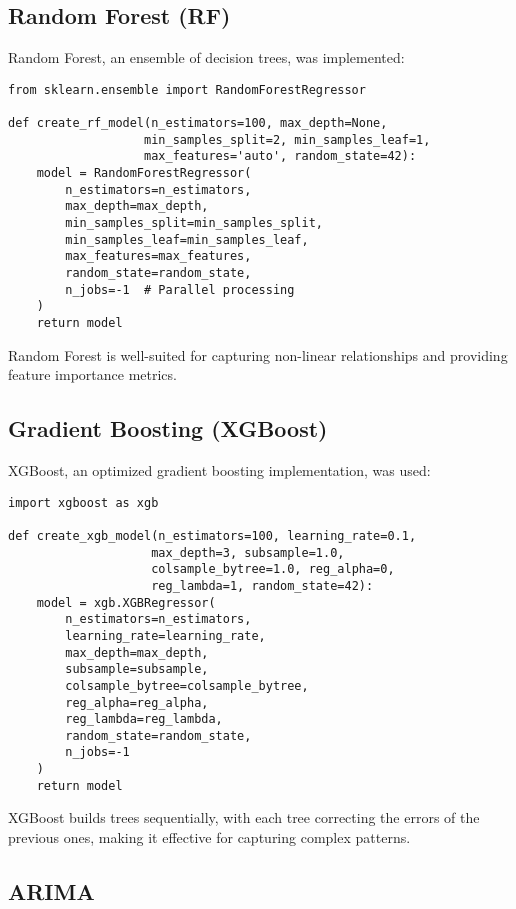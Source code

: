 \documentclass[12pt]{article}
\begin{document}
\subsection{Random Forest (RF)}
\label{subsec:rf}

Random Forest, an ensemble of decision trees, was implemented:

\begin{verbatim}
from sklearn.ensemble import RandomForestRegressor

def create_rf_model(n_estimators=100, max_depth=None, 
                   min_samples_split=2, min_samples_leaf=1,
                   max_features='auto', random_state=42):
    model = RandomForestRegressor(
        n_estimators=n_estimators,
        max_depth=max_depth,
        min_samples_split=min_samples_split,
        min_samples_leaf=min_samples_leaf,
        max_features=max_features,
        random_state=random_state,
        n_jobs=-1  # Parallel processing
    )
    return model
\end{verbatim}

Random Forest is well-suited for capturing non-linear relationships and providing feature importance metrics.

\subsection{Gradient Boosting (XGBoost)}
\label{subsec:xgboost}

XGBoost, an optimized gradient boosting implementation, was used:

\begin{verbatim}
import xgboost as xgb

def create_xgb_model(n_estimators=100, learning_rate=0.1, 
                    max_depth=3, subsample=1.0, 
                    colsample_bytree=1.0, reg_alpha=0,
                    reg_lambda=1, random_state=42):
    model = xgb.XGBRegressor(
        n_estimators=n_estimators,
        learning_rate=learning_rate,
        max_depth=max_depth,
        subsample=subsample,
        colsample_bytree=colsample_bytree,
        reg_alpha=reg_alpha,
        reg_lambda=reg_lambda,
        random_state=random_state,
        n_jobs=-1
    )
    return model
\end{verbatim}

XGBoost builds trees sequentially, with each tree correcting the errors of the previous ones, making it effective for capturing complex patterns.

\subsection{ARIMA}
\label{subsec:arima}
\end{document}
